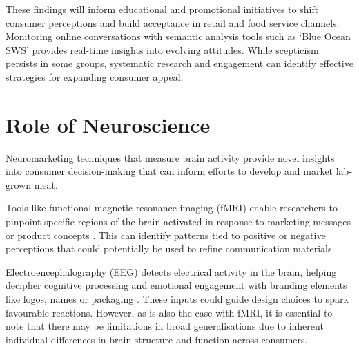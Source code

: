 \documentclass[10pt]{article}
\begin{document}
\begin{sloppypar}
  These findings will inform educational and promotional initiatives to shift consumer perceptions and build acceptance in retail and food service channels. Monitoring online conversations with semantic analysis tools such as ‘Blue Ocean SWS’ provides real-time insights into evolving attitudes. While scepticism persists in some groups, systematic research and engagement can identify effective strategies for expanding consumer appeal.

  \section{Role of Neuroscience}
  \label{sec:role-of-neuroscience}

  Neuromarketing techniques that measure brain activity provide novel insights into consumer decision-making that can inform efforts to develop and market lab-grown meat.

  Tools like functional magnetic resonance imaging (fMRI) enable researchers to pinpoint specific regions of the brain activated in response to marketing messages or product concepts \citep{bryant_consumer_2018}. This can identify patterns tied to positive or negative perceptions that could potentially be used to refine communication materials.

  Electroencephalography (EEG) detects electrical activity in the brain, helping decipher cognitive processing and emotional engagement with branding elements like logos, names or packaging \citep{khushaba_consumer_2013}. These inputs could guide design choices to spark favourable reactions. However, as is also the case with fMRI, it is essential to note that there may be limitations in broad generalisations due to inherent individual differences in brain structure and function across consumers.


\end{sloppypar}
\end{document}
